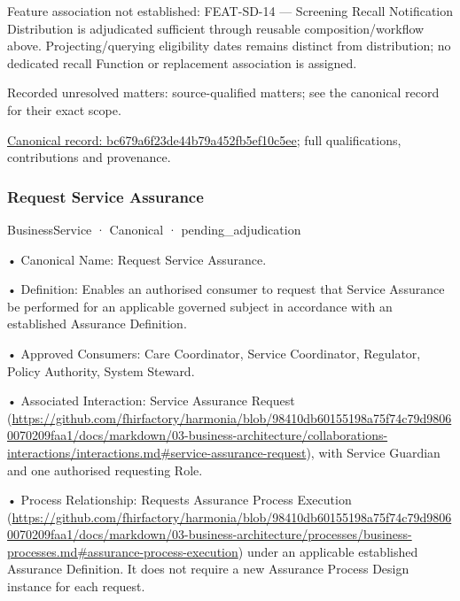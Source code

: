 Feature association not established: FEAT-SD-14 — Screening Recall Notification Distribution is adjudicated sufficient through reusable composition/workflow above. Projecting/querying eligibility dates remains distinct from distribution; no dedicated recall Function or replacement association is assigned.


{\small Recorded unresolved matters: source-qualified matters; see the canonical record for their exact scope.}\par
{\footnotesize \href{../../../../continuum/business/business-service/bc679a6f23de44b79a452fb5ef10c5ee.md}{Canonical record: bc679a6f23de44b79a452fb5ef10c5ee}; full qualifications, contributions and provenance.}\par
\subsubsection{Request Service Assurance}

\label{element:a76c0be369744fcfb5eb91b90c9b59e7}
{\small BusinessService · Canonical · pending\_adjudication}\par

•
Canonical Name: Request Service Assurance.



•
Definition: Enables an authorised consumer to request that Service Assurance be performed for an applicable governed subject in accordance with an established Assurance Definition.



•
Approved Consumers: Care Coordinator, Service Coordinator, Regulator, Policy Authority, System Steward.



•
Associated Interaction: Service Assurance Request (\url{https://github.com/fhirfactory/harmonia/blob/98410db60155198a75f74c79d98060070209faa1/docs/markdown/03-business-architecture/collaborations-interactions/interactions.md#service-assurance-request}), with Service Guardian and one authorised requesting Role.



•
Process Relationship: Requests Assurance Process Execution (\url{https://github.com/fhirfactory/harmonia/blob/98410db60155198a75f74c79d98060070209faa1/docs/markdown/03-business-architecture/processes/business-processes.md#assurance-process-execution}) under an applicable established Assurance Definition. It does not require a new Assurance Process Design instance for each request.



